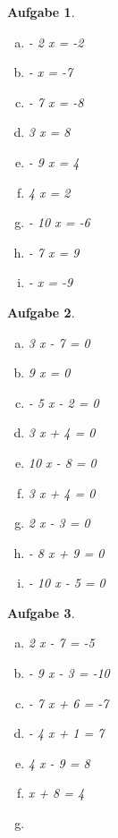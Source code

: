 \documentclass[12pt,fleqn]{article}
\theoremstyle{aufg}
\newtheorem{aufgabe}{Aufgabe}
\theoremstyle{bsp}
\begin{document}
 
    \begin{flushleft}
\begin{center}\end{center}\begin{aufgabe} ~ \\ 
\begin{multicols}{3} 
\begin{enumerate}[a)] 
\item 
- 2 x = -2
\item 
- x = -7
\item 
- 7 x = -8
\item 
3 x = 8
\item 
- 9 x = 4
\item 
4 x = 2
\item 
- 10 x = -6
\item 
- 7 x = 9
\item 
- x = -9
\end{enumerate} 
\end{multicols} 
\end{aufgabe} 
\begin{aufgabe} ~ \\ 
\begin{multicols}{3} 
\begin{enumerate}[a)] 
\item 
3 x - 7 = 0
\item 
9 x = 0
\item 
- 5 x - 2 = 0
\item 
3 x + 4 = 0
\item 
10 x - 8 = 0
\item 
3 x + 4 = 0
\item 
2 x - 3 = 0
\item 
- 8 x + 9 = 0
\item 
- 10 x - 5 = 0
\end{enumerate} 
\end{multicols} 
\end{aufgabe} 
\begin{aufgabe} ~ \\ 
\begin{multicols}{3} 
\begin{enumerate}[a)] 
\item 
2 x - 7 = -5
\item 
- 9 x - 3 = -10
\item 
- 7 x + 6 = -7
\item 
- 4 x + 1 = 7
\item 
4 x - 9 = 8
\item 
x + 8 = 4
\item 

\end{enumerate}
\end{multicols}
\end{aufgabe}
\end{flushleft}
\end{document}
